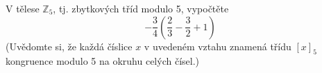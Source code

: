 V tělese $\mathbb{Z}_{5}$, tj. zbytkových tříd modulo 5, vypočtěte
$$-\frac{3}{4}\left ( \frac{2}{3}-\frac{3}{2} +1\right )$$
(Uvědomte si, že každá číslice $x$ v uvedeném vztahu znamená třídu $\left [ x
\right ]_{5}$ kongruence modulo 5 na okruhu celých čísel.)
